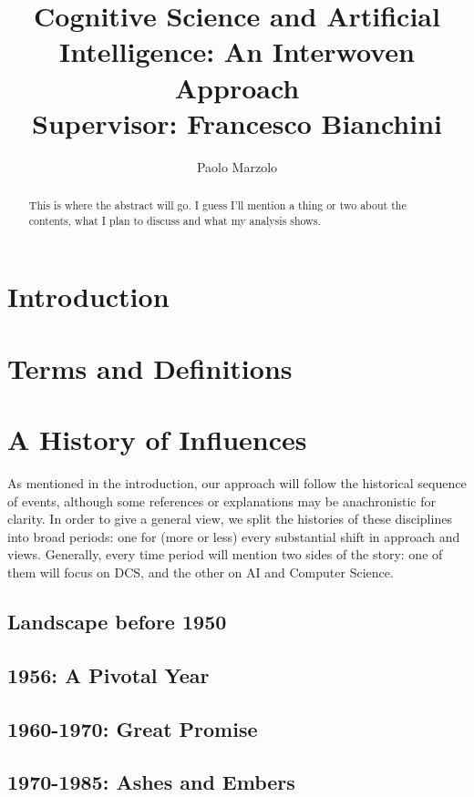 \documentclass{article}
\title{Cognitive Science and Artificial Intelligence: An Interwoven Approach \\
\large Supervisor: Francesco Bianchini}
\author{Paolo Marzolo}
\begin{document}
\begin{abstract}
    This is where the abstract will go. I guess I'll mention a thing or two about the contents, what I plan to discuss and what my analysis shows.
\end{abstract}

\maketitle
\newpage

\section{Introduction}


\section{Terms and Definitions}


\section{A History of Influences}
As mentioned in the introduction, our approach will follow the historical sequence of events, although some references or explanations may be anachronistic for clarity. In order to give a general view, we split the histories of these disciplines into broad periods: one for (more or less) every substantial shift in approach and views. Generally, every time period will mention two sides of the story: one of them will focus on DCS, and the other on AI and Computer Science.

\subsection{Landscape before 1950}


\subsection{1956: A Pivotal Year}


\subsection{1960-1970: Great Promise}


\subsection{1970-1985: Ashes and Embers}

\end{document}
